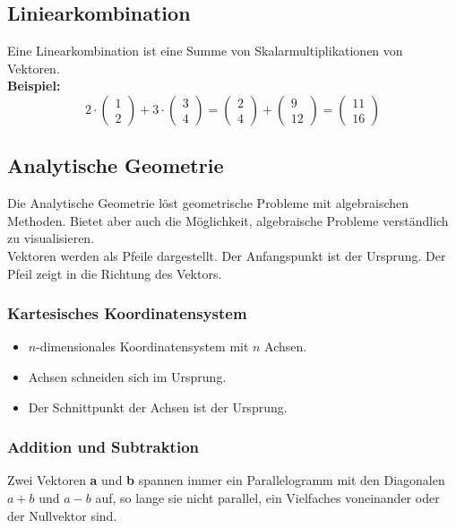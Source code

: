 \documentclass[12pt,a4paper]{article}
\begin{document}
\subsection{Liniearkombination}
Eine Linearkombination ist eine Summe von Skalarmultiplikationen von Vektoren. \\
\textbf{Beispiel:}
\[
2 \cdot
\begin{pmatrix}
1 \\
2
\end{pmatrix}
+
3 \cdot
\begin{pmatrix}
3 \\
4
\end{pmatrix}
=
\begin{pmatrix}
2 \\
4
\end{pmatrix}
+
\begin{pmatrix}
9 \\
12
\end{pmatrix}
=
\begin{pmatrix}
11 \\
16
\end{pmatrix}
\]

\subsection{Analytische Geometrie}
Die Analytische Geometrie löst geometrische Probleme mit algebraischen Methoden. Bietet aber auch die Möglichkeit, algebraische Probleme verständlich zu visualisieren. \\

Vektoren werden als Pfeile dargestellt. Der Anfangspunkt ist der Ursprung. Der Pfeil zeigt in die Richtung des Vektors. \\

\subsubsection{Kartesisches Koordinatensystem}
\begin{itemize}
    \item $n$-dimensionales Koordinatensystem mit $n$ Achsen.
    \item Achsen schneiden sich im Ursprung.
    \item Der Schnittpunkt der Achsen ist der Ursprung.
\end{itemize}

\subsubsection{Addition und Subtraktion}
Zwei Vektoren \textbf{a} und \textbf{b} spannen immer ein Parallelogramm mit den Diagonalen \textbf{$a+b$} und \textbf{$a-b$} auf, so lange sie nicht parallel, ein Vielfaches voneinander oder der Nullvektor sind. \\
\end{document}
